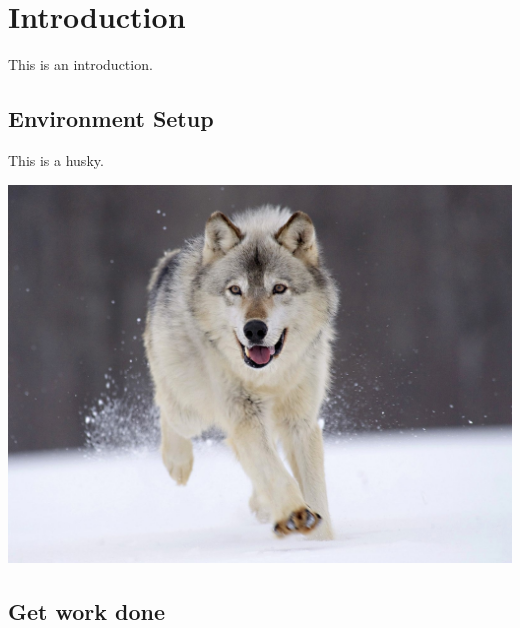 
\chapter{Introduction}

This is an introduction.

\section{Environment Setup}

This is a husky.

\includegraphics[scale=0.25]{chapter1/husky}

\blindtext[3]

\section{Get work done}

\blindtext[3]
